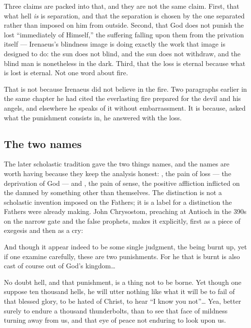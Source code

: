 Three claims are packed into that, and they are not the same claim. First, that what hell \emph{is} is separation, and that the separation is chosen by the one separated rather than imposed on him from outside. Second, that God does not punish the lost ``immediately of Himself,'' the suffering falling upon them from the privation itself --- Irenaeus's blindness image is doing exactly the work that image is designed to do: the sun does not blind, and the sun does not withdraw, and the blind man is nonetheless in the dark. Third, that the loss is eternal because what is lost is eternal. Not one word about fire.

That is not because Irenaeus did not believe in the fire. Two paragraphs earlier in the same chapter he had cited the everlasting fire prepared for the devil and his angels, and elsewhere he speaks of it without embarrassment. It is because, asked what the punishment consists in, he answered with the loss.

\subsection{The two names}

The later scholastic tradition gave the two things names, and the names are worth having because they keep the analysis honest: , the pain of loss --- the deprivation of God --- and , the pain of sense, the positive affliction inflicted on the damned by something other than themselves. The distinction is not a scholastic invention imposed on the Fathers; it is a label for a distinction the Fathers were already making. John Chrysostom, preaching at Antioch in the 390s on the narrow gate and the false prophets, makes it explicitly, first as a piece of exegesis and then as a cry:

\begin{studyframe}
\setlength{\parskip}{0.5em}
And though it appear indeed to be some single judgment, the being burnt up, yet if one examine carefully, these are two punishments. For he that is burnt is also cast of course out of God's kingdom\ldots{}

No doubt hell, and that punishment, is a thing not to be borne. Yet though one suppose ten thousand hells, he will utter nothing like what it will be to fail of that blessed glory, to be hated of Christ, to hear ``I know you not''\ldots{} Yea, better surely to endure a thousand thunderbolts, than to see that face of mildness turning away from us, and that eye of peace not enduring to look upon us.
\end{studyframe}

